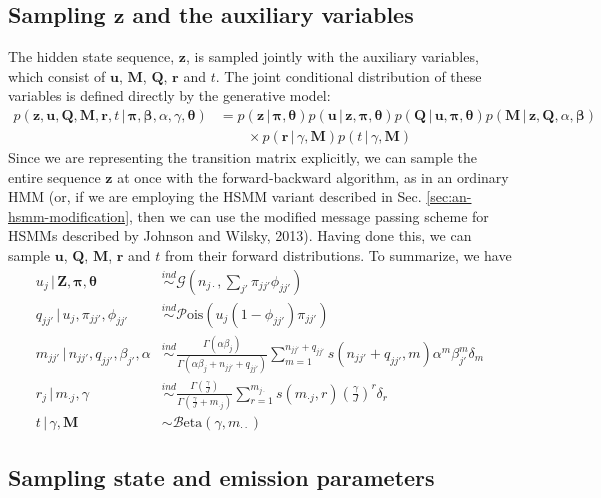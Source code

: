 \documentclass[12pt,letterpaper]{report}
\newcommand{\Pois}[1]{\mathcal{P}\mathrm{ois}(#1)}
\newcommand{\Gamm}[2]{\mathcal{G}(#1,#2)}
\newcommand{\Beta}[2]{\mathcal{B}\mathrm{eta}(#1,#2)}
\newcommand{\given}{\, \vert \,}
\newcommand{\bM}{\mathbf{M}}
\newcommand{\bQ}{\mathbf{Q}}
\newcommand{\bz}{\mathbf{z}}
\newcommand{\bZ}{\mathbf{Z}}
\newcommand{\bu}{\mathbf{u}}
\newcommand{\br}{\mathbf{r}}
\newcommand{\bbeta}{\boldsymbol{\beta}}
\newcommand{\btheta}{\boldsymbol{\theta}}
\newcommand{\bpi}{\boldsymbol{\pi}}
\begin{document}
\subsection{Sampling $\bz$ and the auxiliary variables}
\label{sec:sampling-z_t}

The hidden state sequence, $\bz$, is sampled jointly with the auxiliary
variables, which consist of $\bu$, $\bM$, $\bQ$, $\br$ and $t$.  The
joint conditional distribution of these variables is defined directly
by the generative model:
\begin{align}
  \label{eq:19}
  p(\bz, \bu, \bQ, \bM, \br, t \given \bpi, \bbeta, \alpha, \gamma,
  \btheta) &= p(\bz \given \bpi, \btheta) p(\bu \given \bz, \bpi, \btheta) p(\bQ \given
  \bu, \bpi, \btheta) p(\bM \given
  \bz, \bQ, \alpha, \bbeta) \\
  &\qquad \times p(\br \given
  \gamma, \bM) p(t \given \gamma, \bM)
\end{align}
Since we are representing the transition matrix explicitly, we can
sample the entire sequence $\bz$ at once with the forward-backward algorithm,
as in an ordinary HMM (or, if we are employing the HSMM variant
described in Sec. \ref{sec:an-hsmm-modification}, then we can use the
modified message passing scheme for HSMMs described by Johnson and
Wilsky, 2013).  Having done this, we can sample $\bu$, $\bQ$, $\bM$,
$\br$ and $t$ from their forward distributions.  To summarize,
we have
\begin{align}
  \label{eq:48}
  u_j \given \bZ, \bpi, \btheta &\stackrel{ind}{\sim}
  \Gamm{n_{j\cdot}}{\sum_{j'} \pi_{jj'}\phi_{jj'}} \\
  q_{jj'} \given u_j, \pi_{jj'}, \phi_{jj'} &\stackrel{ind}{\sim}
  \Pois{u_j(1 - \phi_{jj'})\pi_{jj'}} \\
  m_{jj'} \given n_{jj'}, q_{jj'}, \beta_{j'}, \alpha &\stackrel{ind}{\sim}
  \frac{\Gamma(\alpha\beta_j)}{\Gamma(\alpha\beta_j + n_{jj'} +
    q_{jj'})}\sum_{m=1}^{n_{jj'} + q_{jj'}} s(n_{jj'} + q_{jj'}, m) \alpha^m \beta_{j'}^m \delta_{m}
  \\
  r_j \given m_{\cdot j}, \gamma &\stackrel{ind}{\sim}
  \frac{\Gamma(\frac{\gamma}{J})}{\Gamma(\frac{\gamma}{J} + m_{\cdot
      j})} \sum_{r=1}^{m_{j\cdot}} s(m_{\cdot j}, r)
  \left(\frac{\gamma}{J}\right)^r \delta_r \\
  t \given \gamma, \bM &\sim \Beta{\gamma}{m_{\cdot\cdot}}
\end{align}

\subsection{Sampling state and emission parameters}
\label{sec:sampling-eta}
\end{document}

